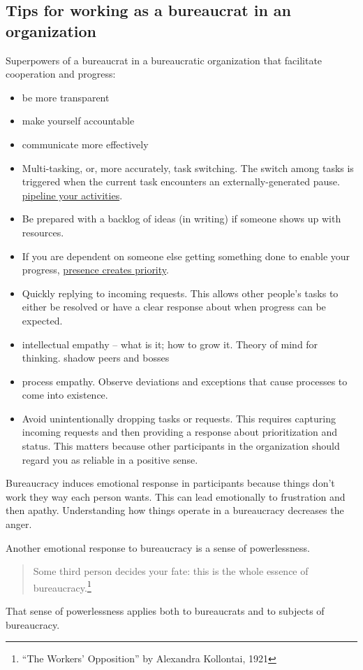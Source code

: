 \subsection{Tips for working as a bureaucrat in an organization}

Superpowers of a bureaucrat in a bureaucratic organization that facilitate cooperation and progress:
\begin{itemize}
    \item be more transparent
    \item make yourself accountable
    \item communicate more effectively
    \item Multi-tasking, or, more accurately, task switching. The switch among tasks is triggered when the current task encounters an externally-generated pause. \href{https://en.wikipedia.org/wiki/Pipeline_(computing)#Concept_and_motivation}{pipeline your activities}.
    \item Be prepared with a backlog of ideas (in writing) if someone shows up with resources.
    \item If you are dependent on someone else getting something done to enable your progress, \underline{presence creates priority}.
    \item Quickly replying to incoming requests. This allows other people's tasks to either be resolved or have a clear response about when progress can be expected. 
    \item intellectual empathy -- what is it; how to grow it. Theory of mind for thinking. shadow peers and bosses
    \item process empathy. Observe deviations and exceptions that cause processes to come into existence. 
    \item Avoid unintentionally dropping tasks or requests. This requires capturing incoming requests and then providing a response about prioritization and status. This matters because other participants in the organization should regard you as reliable in a positive sense. 
\end{itemize}

Bureaucracy induces emotional response in participants because things don't work they way each person wants. This can lead emotionally to frustration and then apathy. Understanding how things operate in a bureaucracy decreases the anger.


Another emotional response to bureaucracy is a sense of powerlessness. 
\begin{quote}
Some third person decides your fate: this is the whole essence of bureaucracy.\footnote{``The Workers' Opposition'' by Alexandra Kollontai, 1921}
\end{quote}
That sense of powerlessness applies both to bureaucrats and to subjects of bureaucracy. 

